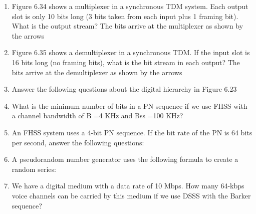 \begin{enumerate}[resume]
  \item Figure 6.34 shows a multiplexer in a synchronous TDM system. Each output slot is only 10 bits long (3 bits taken from each input plus 1 framing bit). What is the output stream? The bits arrive at the multiplexer as shown by the arrows
  \item Figure 6.35 shows a demultiplexer in a synchronous TDM. If the input slot is 16 bits long (no framing bits), what is the bit stream in each output? The bits arrive at the demultiplexer as shown by the arrows
  \item Answer the following questions about the digital hierarchy in Figure 6.23
  \item What is the minimum number of bits in a PN sequence if we use FHSS with a channel bandwidth of B =4 KHz and Bss =100 KHz?
  \item An FHSS system uses a 4-bit PN sequence. If the bit rate of the PN is 64 bits per second, answer the following questions:
  \item A pseudorandom number generator uses the following formula to create a random series:
  \item We have a digital medium with a data rate of 10 Mbps. How many 64-kbps voice channels can be carried by this medium if we use DSSS with the Barker sequence?
\end{enumerate}